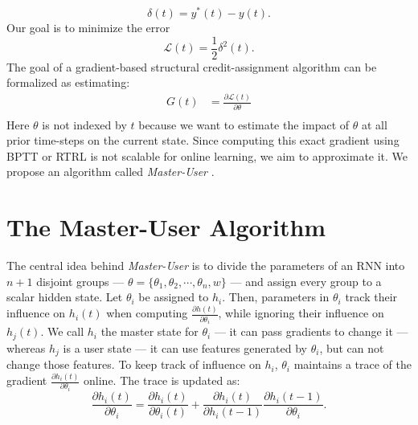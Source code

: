 \documentclass{article}
\newcommand{\algoname}{\textit{Master-User} }
\begin{document}
\begin{equation}
    \delta(t) = y^*(t) - y(t).
\end{equation}
Our goal is to minimize the error 
\begin{equation}
    \mathcal L(t) = \frac{1}{2}\delta^2(t).
\end{equation}
The goal of a gradient-based structural credit-assignment algorithm can be formalized as estimating:
\begin{align}
G(t) &= \frac{\partial \mathcal L(t)}{\partial \theta} \\ 
\end{align}
Here $\theta$ is not indexed by $t$ because we want to estimate the impact of $\theta$ at all prior time-steps on the current state. Since computing this exact gradient using BPTT or RTRL is not scalable for online learning, we aim to approximate it. We propose an algorithm called \algoname.  
 
 \section{The Master-User Algorithm}
 The central idea behind \algoname is to divide the parameters of an RNN into $n+1$ disjoint groups --- $\theta = \{\theta_1, \theta_2, \cdots, \theta_n, w\}$ --- and assign every group to a scalar hidden state. Let  $\theta_i$ be assigned to $h_i$. Then, parameters in $\theta_i$ track their influence on $h_i(t)$ when computing $\frac{\partial h(t)}{\partial \theta_i}$, while ignoring their influence on $h_j(t)$. We call $h_i$ the master state for $\theta_i$ --- it can pass gradients to change it --- whereas $h_j$ is a user state --- it can use features generated by $\theta_i$, but can not change those features. To keep track of influence on $h_i$, $\theta_i$ maintains a trace of the gradient $\frac{\partial h_i(t)}{\partial \theta_i}$ online. The trace is updated as: 
 \begin{equation}
 \frac{\partial h_i(t)}{\partial \theta_i} =  \frac{\partial h_i(t)}{\partial \theta_i(t)} + \frac{\partial h_i(t)}{\partial h_i(t-1)} \frac{\partial h_i(t-1)}{\partial \theta_i}.
 \label{master_user}
 \end{equation}
 
\end{document}
